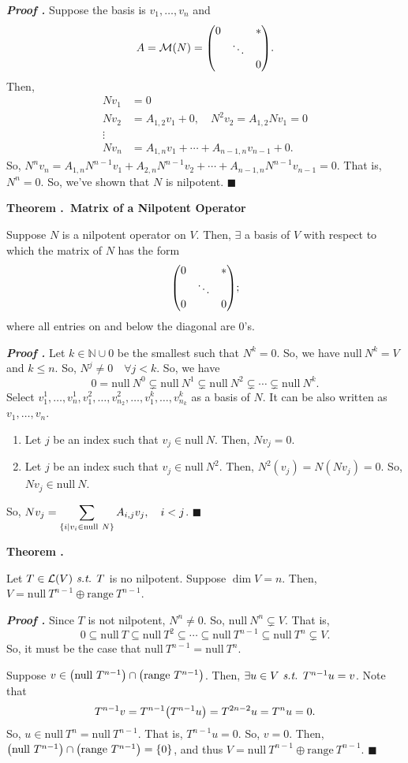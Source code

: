 \documentclass[11pt, letterpaper]{article}
\newcounter{index}[subsection]
\newenvironment*{thm}[1]{\begin{tcolorbox}\par\noindent\textbf{Theorem \thesubsection.\stepcounter{index}\theindex\ #1} \par}{\par\end{tcolorbox}}
\newcounter{nprf}[subsection]
\newenvironment*{prf}{\par\indent\textbf{\textit{Proof \stepcounter{nprf}\thenprf.}}}{\hfill$\blacksquare$\par}
\def\dsst{\displaystyle}
\def\N{\mathbb{N}}
\def\L{\mathcal{L}}
\def\M{\mathcal{M}}
\def\st{\emph{ s.t. }}
\def\Null{\mathrm{null\ }}
\def\range{\mathrm{range\ }}
\begin{document}
\begin{prf}
	Suppose the basis is $v_1,\dots,v_n$ and \[A=\M(N)=\mqty(0&&*\\&\ddots&\\&&0).\] Then, \[\begin{aligned}Nv_1&=0\\Nv_2&=A_{1,2}v_1+0,\quad N^2v_2=A_{1,2}Nv_1=0\\\vdots\\Nv_n&=A_{1,n}v_1+\cdots+A_{n-1,n}v_{n-1}+0.\end{aligned}\] So, $N^nv_n=A_{1,n}N^{n-1}v_1+A_{2,n}N^{n-1}v_2+\cdots+A_{n-1,n}N^{n-1}v_{n-1}=0$. That is, $N^n=0$. So, we've shown that $N$ is nilpotent. 
\end{prf}
\begin{thm}{Matrix of a Nilpotent Operator}
	Suppose $N$ is a nilpotent operator on $V$. Then, $\exists$ a basis of $V$ with respect to which the matrix of $N$ has the form \[\mqty(0&&*\\&\ddots&\\0&&0);\]	where all entries on and below the diagonal are $0$'s.
\end{thm}
\begin{prf}
	Let $k\in\N\cup\qty{0}$ be the smallest such that $N^k=0$. So, we have $\Null N^k=V$ and $k\leq n$. So, $N^j\neq0\quad\forall j<k$. So, we have \[\qty{0}=\Null N^0\subsetneq\Null N^1\subsetneq \Null N^2\subsetneq\cdots\subsetneq\Null N^k.\] Select $v_1^1,\dots,v_n^1,v_1^2,\dots,v_{n_2}^2,\dots,v_1^k,\dots,v_{n_k}^k$ as a basis of $N$. It can be also written as $v_1,\dots,v_n$. 
	\begin{enumerate}
		\item Let $j$ be an index such that $v_j\in\Null N$. Then, $Nv_j=0$.
		\item Let $j$ be an index such that $v_j\in\Null N^2$. Then, $N^2(v_j)=N(Nv_j)=0$. So, $Nv_j\in\Null N$.
	\end{enumerate}
	So, $\dsst Nv_j=\sum_{\qty{i\mid v_i\in\Null N}}A_{i,j}v_j,\quad i<j$.
\end{prf}
\begin{thm}{}
	Let $T\in\L(V)\st T$ is no nilpotent. Suppose $\dim V=n$. Then, $V=\Null T^{n-1}\oplus\range T^{n-1}$.
\end{thm}
\begin{prf}
	Since $T$ is not nilpotent, $N^n\neq0$. So, $\Null N^n\subsetneq V$. That is, \[0\subseteq\Null T\subseteq\Null T^2\subseteq\cdots\subseteq\Null T^{n-1}\subseteq\Null T^n\subsetneq V.\] So, it must be the case that $\Null T^{n-1}=\Null T^n$. \par Suppose $v\in\qty(\Null T^{n-1})\cap\qty(\range T^{n-1})$. Then, $\exists u\in V\st T^{n-1}u=v$. Note that \[T^{n-1}v=T^{n-1}\qty(T^{n-1}u)=T^{2n-2}u=T^nu=0.\] So, $u\in\Null T^n=\Null T^{n-1}$. That is, $T^{n-1}u=0$. So, $v=0$. Then, $\qty(\Null T^{n-1})\cap\qty(\range T^{n-1})=\qty{0}$, and thus $V=\Null T^{n-1}\oplus\range T^{n-1}$.
\end{prf}
\end{document}

